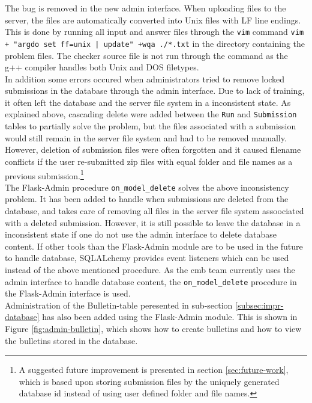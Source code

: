 The bug is removed in the new admin interface. When uploading files to the server, the files are automatically converted into Unix files with LF line endings. This is done by running all input and answer files through the \texttt{vim} \cite{VIM} command \texttt{vim + "argdo set ff=unix | update" +wqa ./*.txt} in the directory containing the problem files. The checker source file is not run through the command as the g++ compiler handles both Unix and DOS filetypes. \\

In addition some errors occured when administrators tried to remove locked submissions in the database through the admin interface. Due to lack of training, it often left the database and the server file system in a inconsistent state. As explained above, cascading delete were added between the \texttt{Run} and \texttt{Submission} tables to partially solve the problem, but the files associated with a submission would still remain in the server file system and had to be removed manually. However, deletion of submission files were often forgotten and it caused filename conflicts if the user re-submitted zip files with equal folder and file names as a previous submission.\footnote{A suggested future improvement is presented in section \ref{sec:future-work}, which is based upon storing submission files by the uniquely generated database id instead of using user defined folder and file names.}\\

The Flask-Admin \cite{FLASKADMIN} procedure \texttt{on\_model\_delete} solves the above inconsistency problem. It has been added to handle when submissions are deleted from the database, and takes care of removing all files in the server file system assoociated with a deleted submission. However, it is still possible to leave the database in a inconsistent state if one do not use the admin interface to delete database content. If other tools than the Flask-Admin module are to be used in the future to handle database, SQLALchemy provides event listeners which can be used instead of the above mentioned procedure. As the \gls{cmb} team currently uses the admin interface to handle database content, the \texttt{on\_model\_delete} procedure in the Flask-Admin interface is used. \\

Administration of the Bulletin-table peresented in sub-section \ref{subsec:impr-database} has also been added using the Flask-Admin module. This is shown in Figure \ref{fig:admin-bulletin}, which shows how to create bulletins and how to view the bulletins stored in the database.

